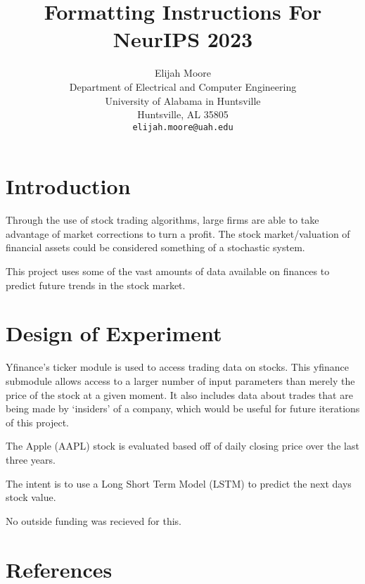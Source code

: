 \documentclass{article}
\title{Formatting Instructions For NeurIPS 2023}
\author{%
  Elijah Moore \\
  Department of Electrical and Computer Engineering\\
  University of Alabama in Huntsville\\
  Huntsville, AL 35805 \\
  \texttt{elijah.moore@uah.edu} \\
}
\begin{document}
\maketitle


\begin{abstract}
  
\end{abstract}

\section{Introduction}

    Through the use of stock trading algorithms, large firms are able to take advantage of market corrections
    to turn a profit. The stock market/valuation of financial assets could be considered something of a stochastic system.
   
    This project uses some of the vast amounts of data available on finances to
    predict future trends in the stock market.

\section{Design of Experiment}
    Yfinance's ticker module is used to access trading data on stocks.
    This yfinance submodule allows access to a larger number of input parameters than merely the price of the stock at a given moment.
    It also includes data about trades that are being made by `insiders' of a company, which would be useful for future iterations of this project.

    The Apple (AAPL) stock is evaluated based off of daily closing price over the last three years.

    The intent is to use a Long Short Term Model (LSTM) to predict the next days stock value.
    





\begin{ack}

    No outside funding was recieved for this.


\end{ack}


\section*{References}


{
\small

}

\end{document}
